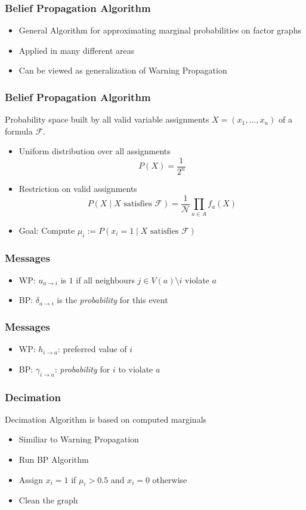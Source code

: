 \begin{frame}
	\frametitle{Belief Propagation Algorithm}
	\begin{itemize}
		\item General Algorithm for approximating marginal probabilities on factor graphs
		\item Applied in many different areas
		\item Can be viewed as generalization of Warning Propagation
	\end{itemize}
\end{frame}

\begin{frame}
	\frametitle{Belief Propagation Algorithm}
	Probability space built by all valid variable assignments $X = (x_1, \ldots, x_n)$ of a formula $\mathcal{F}$.
	\begin{itemize}
		\item Uniform distribution over all assignments 
		$$P(X) = \frac{1}{2^n}$$
		\item Restriction on valid assignments
	$$P(X \; | \; X \text{ satisfies } \mathcal{F}) = \frac{1}{\mathcal{N}} \prod_{a \in A} f_a(X)$$
	\item Goal: Compute $\mu_i := P(x_i = 1 \; | \; X \text{ satisfies } \mathcal{F})$
	\end{itemize}
\end{frame}

\begin{frame}
	\frametitle{Messages}
	
	\begin{itemize}
		\item WP: $u_{a \rightarrow i}$ is $1$ if all neighbours $j \in V(a) \setminus i$ violate $a$
		\item BP: $\delta_{a \rightarrow i}$ is the \emph{probability} for this event
	\end{itemize}
	
	
\end{frame}

\begin{frame}
	\frametitle{Messages}
	
	\begin{itemize}
		\item WP: $h_{i \rightarrow a}$: preferred value of $i$
		\item BP: $\gamma_{i \rightarrow a}$: \emph{probability} for $i$ to violate $a$
	\end{itemize}
\end{frame}

\begin{frame}
	\frametitle{Decimation}
	Decimation Algorithm is based on computed marginals
	\begin{itemize}
		\item Similiar to Warning Propagation
		\item Run BP Algorithm
		\item Assign $x_i = 1$ if $\mu_i > 0.5$ and $x_i = 0$ otherwise
		\item Clean the graph
	\end{itemize}
\end{frame}


